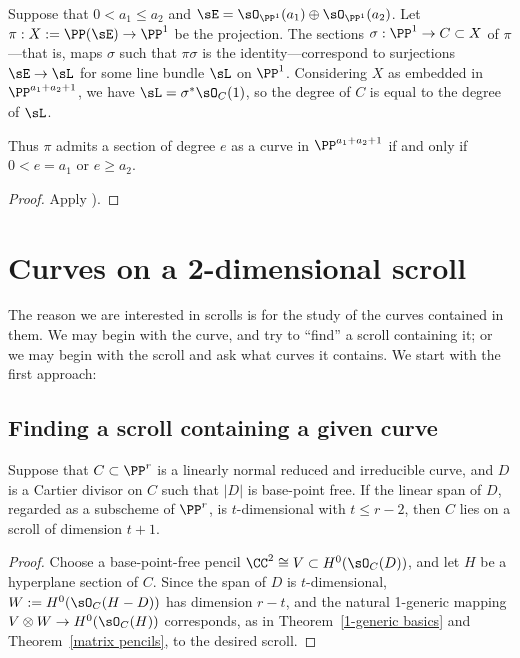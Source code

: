 \begin{proposition} Suppose that $0<a_1\leq a_2$ and
$\sE = \sO_{\PP^1}(a_1)\oplus \sO_{\PP^1}(a_2)$. Let $\pi: X:= \PP(\sE) \to \PP^1$ be the projection.
The sections $\sigma:\PP^1 \to C\subset X$ of $\pi$---that is, maps $\sigma$ such that $\pi\sigma$ is the 
identity---correspond to surjections
$\sE \to \sL$ for some line bundle $\sL$ on $\PP^1$. Considering  $X$ as embedded in 
$\PP^{a_1+a_2+1}$, we have $\sL = \sigma^*\sO_C(1)$, so the degree of $C$ is equal
to the degree of $\sL$.

Thus $\pi$ admits a section of degree $e$ as a curve in $\PP^{a_1+a_2+1}$ if and only if
$0<e = a_1$ or $e\geq a_2$.
\end{proposition}

\begin{proof}
Apply \cite[II.7.12]{Hartshorne1977}).
\end{proof}



\section{Curves on a 2-dimensional scroll}\label{curves on scrolls}
The reason we are interested in scrolls is for the study of the curves contained in them.
We may begin with the curve, and try to ``find'' a scroll containing it; or we may begin with the scroll and ask
what curves it contains. We start with the first approach:

\subsection{Finding a scroll containing a given curve}

\begin{proposition}
Suppose that $C\subset \PP^r$ is a linearly normal reduced and irreducible curve, and $D$ is a  Cartier divisor on $C$ such that $|D|$ is base-point free. If the linear span of $D$, regarded as a subscheme of $\PP^{r}$, is $t$-dimensional with $t\leq r-2$, then $C$ lies on a scroll of dimension $t+1$.
\end{proposition}

\begin{proof}
Choose a base-point-free pencil $\CC^2\cong V \subset H^0(\sO_C(D))$, and let $H$ be a hyperplane section of $C$. Since the span of $D$ is $t$-dimensional, $W:=H^0(\sO_C(H-D))$ has dimension $r-t$, and the natural 1-generic mapping
$V\otimes W \to H^0(\sO_C(H))$ corresponds, as in Theorem~\ref{1-generic basics} and Theorem~\ref{matrix pencils}, to the desired scroll.
\end{proof}

